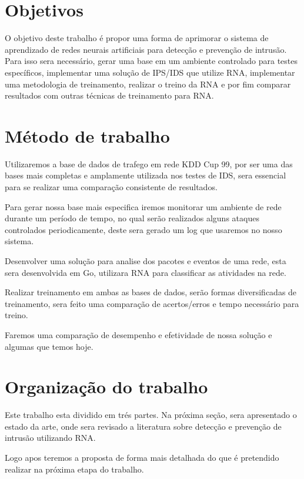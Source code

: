 \documentclass[
	12pt,				%
	openright,			%
	oneside,
	a4paper,			%
	english,			%
	french,				%
	spanish,			%
	brazil				%
	]{abntex2}
\begin{document}
\section{Objetivos}

O objetivo deste trabalho é propor uma forma de aprimorar o sistema de aprendizado de redes neurais artificiais para detecção e prevenção de intrusão. 
Para isso sera necessário, gerar uma base em um ambiente controlado para testes específicos, implementar uma solução de IPS/IDS que utilize RNA, implementar uma metodologia de treinamento, realizar o treino da RNA e por fim comparar resultados com outras técnicas de treinamento para RNA.


\section{Método de trabalho}

Utilizaremos a base de dados de trafego em rede KDD Cup 99\cite{KDDCup99}, por ser uma das bases mais completas e amplamente utilizada nos testes de IDS, sera essencial para se realizar uma comparação consistente de resultados.

Para gerar nossa base mais especifica iremos monitorar um ambiente de rede durante um período de tempo, no qual serão realizados alguns ataques controlados periodicamente, deste sera gerado um log que usaremos no nosso sistema.

Desenvolver uma solução para analise dos pacotes e eventos de uma rede, esta sera desenvolvida em Go, utilizara RNA para classificar as atividades na rede.

Realizar treinamento em ambas as bases de dados, serão formas diversificadas de treinamento, sera feito uma comparação de acertos/erros e tempo necessário para treino.

Faremos uma comparação de desempenho e efetividade de nossa solução e algumas que temos hoje.

\section{Organização do trabalho}

Este trabalho esta dividido em trés partes.
Na próxima seção, sera apresentado o estado da arte, onde sera revisado a literatura sobre detecção e prevenção de intrusão utilizando RNA.

Logo apos teremos a proposta  de forma mais detalhada do que é pretendido realizar na próxima etapa do trabalho.
\end{document}

